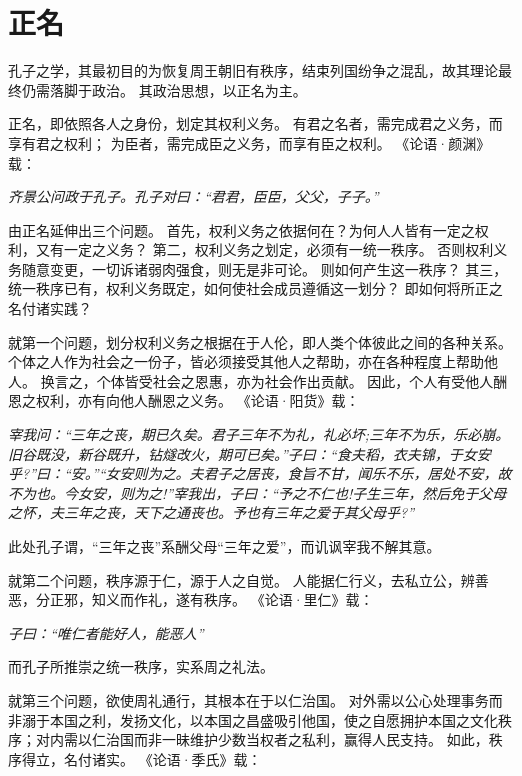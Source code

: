 \documentclass[11pt]{article}
\begin{document}
\section{正名}
孔子之学，其最初目的为恢复周王朝旧有秩序，结束列国纷争之混乱，故其理论最终仍需落脚于政治。
其政治思想，以正名为主。

\par

正名，即依照各人之身份，划定其权利义务。
有君之名者，需完成君之义务，而享有君之权利；
为臣者，需完成臣之义务，而享有臣之权利。
《论语·颜渊》载：

\textit{齐景公问政于孔子。孔子对曰：“君君，臣臣，父父，子子。”}

\par

由正名延伸出三个问题。
首先，权利义务之依据何在？为何人人皆有一定之权利，又有一定之义务？
第二，权利义务之划定，必须有一统一秩序。
否则权利义务随意变更，一切诉诸弱肉强食，则无是非可论。
则如何产生这一秩序？
其三，统一秩序已有，权利义务既定，如何使社会成员遵循这一划分？
即如何将所正之名付诸实践？

\par

就第一个问题，划分权利义务之根据在于人伦，即人类个体彼此之间的各种关系。
个体之人作为社会之一份子，皆必须接受其他人之帮助，亦在各种程度上帮助他人。
换言之，个体皆受社会之恩惠，亦为社会作出贡献。
因此，个人有受他人酬恩之权利，亦有向他人酬恩之义务。
《论语·阳货》载：

\textit{宰我问：“三年之丧，期已久矣。君子三年不为礼，礼必坏;三年不为乐，乐必崩。旧谷既没，新谷既升，钻燧改火，期可已矣。”子曰：“食夫稻，衣夫锦，于女安乎?”曰：“安。”“女安则为之。夫君子之居丧，食旨不甘，闻乐不乐，居处不安，故不为也。今女安，则为之!”宰我出，子曰：“予之不仁也!子生三年，然后免于父母之怀，夫三年之丧，天下之通丧也。予也有三年之爱于其父母乎?”}

此处孔子谓，“三年之丧”系酬父母“三年之爱”，而讥讽宰我不解其意。

\par

就第二个问题，秩序源于仁，源于人之自觉。
人能据仁行义，去私立公，辨善恶，分正邪，知义而作礼，遂有秩序。
《论语·里仁》载：

\textit{子曰：“唯仁者能好人，能恶人”}

而孔子所推崇之统一秩序，实系周之礼法。

\par

就第三个问题，欲使周礼通行，其根本在于以仁治国。
对外需以公心处理事务而非溺于本国之利，发扬文化，以本国之昌盛吸引他国，使之自愿拥护本国之文化秩序；对内需以仁治国而非一昧维护少数当权者之私利，赢得人民支持。
如此，秩序得立，名付诸实。
《论语·季氏》载：
\end{document}
